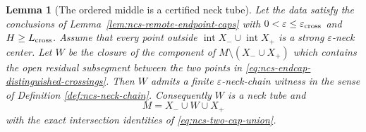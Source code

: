 \documentclass[10pt]{coll-l}
\newtheorem{lemma}[theorem]{Lemma}
\theoremstyle{definition}
\theoremstyle{remark}
\numberwithin{section}{chapter}
\numberwithin{equation}{chapter}
\begin{document}
\begin{lemma}[The ordered middle is a certified neck tube]
\label{lem:ncs-ordered-middle-tube}
Let the data satisfy the conclusions of
Lemma~\ref{lem:ncs-remote-endpoint-caps} with
$0<\varepsilon\leq\varepsilon_{\rm cross}$ and
$H\geq L_{\rm cross}$.  Assume
that every point outside $\operatorname{int}X_-\cup\operatorname{int}X_+$
is a strong $\varepsilon$-neck center.  Let $W$ be the closure of the
component of $M\setminus(X_-\cup X_+)$ which contains the open residual
subsegment between the two points in
\eqref{eq:ncs-endcap-distinguished-crossings}.  Then $W$ admits a finite
$\varepsilon$-neck-chain witness in the sense of Definition
\ref{def:ncs-neck-chain}.  Consequently $W$ is a neck tube and
\begin{equation}
                         M=X_-\cup W\cup X_+           \label{eq:ncs-certified-two-cap-decomposition}
\end{equation}
with the exact intersection identities of
\eqref{eq:ncs-two-cap-union}.
\end{lemma}
\end{document}
